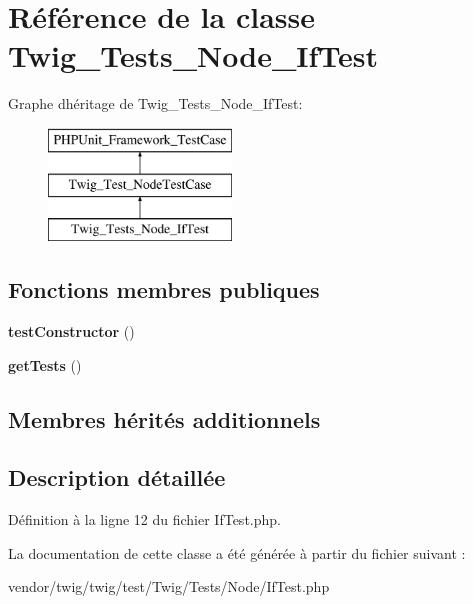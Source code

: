 \hypertarget{class_twig___tests___node___if_test}{}\section{Référence de la classe Twig\+\_\+\+Tests\+\_\+\+Node\+\_\+\+If\+Test}
\label{class_twig___tests___node___if_test}
Graphe d\textquotesingle{}héritage de Twig\+\_\+\+Tests\+\_\+\+Node\+\_\+\+If\+Test\+:\begin{figure}[H]
\begin{center}
\leavevmode
\includegraphics[height=3.000000cm]{class_twig___tests___node___if_test}
\end{center}
\end{figure}
\subsection*{Fonctions membres publiques}
\begin{DoxyCompactItemize}
\item 
{\bfseries test\+Constructor} ()\hypertarget{class_twig___tests___node___if_test_a47094dc941e72950570900d1418f89c6}{}\label{class_twig___tests___node___if_test_a47094dc941e72950570900d1418f89c6}

\item 
{\bfseries get\+Tests} ()\hypertarget{class_twig___tests___node___if_test_a7e247dd31cc8d37a6c97353a062a0080}{}\label{class_twig___tests___node___if_test_a7e247dd31cc8d37a6c97353a062a0080}

\end{DoxyCompactItemize}
\subsection*{Membres hérités additionnels}


\subsection{Description détaillée}


Définition à la ligne 12 du fichier If\+Test.\+php.



La documentation de cette classe a été générée à partir du fichier suivant \+:\begin{DoxyCompactItemize}
\item 
vendor/twig/twig/test/\+Twig/\+Tests/\+Node/If\+Test.\+php\end{DoxyCompactItemize}
